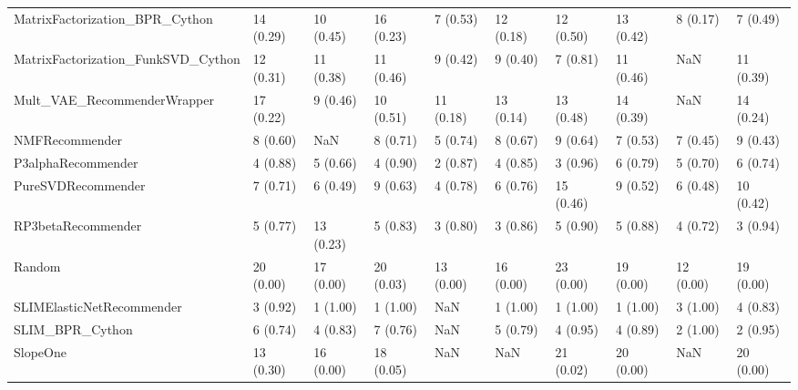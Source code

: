 \begin{tabular}{llllllllll}
     MatrixFactorization\_BPR\_Cython &                14 (0.29) &   10 (0.45) &     16 (0.23) &     7 (0.53) &            12 (0.18) &           12 (0.50) &         13 (0.42) &           8 (0.17) &          7 (0.49) \\
 MatrixFactorization\_FunkSVD\_Cython &                12 (0.31) &   11 (0.38) &     11 (0.46) &     9 (0.42) &             9 (0.40) &            7 (0.81) &         11 (0.46) &                NaN &         11 (0.39) \\
        Mult\_VAE\_RecommenderWrapper &                17 (0.22) &    9 (0.46) &     10 (0.51) &    11 (0.18) &            13 (0.14) &           13 (0.48) &         14 (0.39) &                NaN &         14 (0.24) \\
                     NMFRecommender &                 8 (0.60) &         NaN &      8 (0.71) &     5 (0.74) &             8 (0.67) &            9 (0.64) &          7 (0.53) &           7 (0.45) &          9 (0.43) \\
                 P3alphaRecommender &                 4 (0.88) &    5 (0.66) &      4 (0.90) &     2 (0.87) &             4 (0.85) &            3 (0.96) &          6 (0.79) &           5 (0.70) &          6 (0.74) \\
                 PureSVDRecommender &                 7 (0.71) &    6 (0.49) &      9 (0.63) &     4 (0.78) &             6 (0.76) &           15 (0.46) &          9 (0.52) &           6 (0.48) &         10 (0.42) \\
                 RP3betaRecommender &                 5 (0.77) &   13 (0.23) &      5 (0.83) &     3 (0.80) &             3 (0.86) &            5 (0.90) &          5 (0.88) &           4 (0.72) &          3 (0.94) \\
                             Random &                20 (0.00) &   17 (0.00) &     20 (0.03) &    13 (0.00) &            16 (0.00) &           23 (0.00) &         19 (0.00) &          12 (0.00) &         19 (0.00) \\
          SLIMElasticNetRecommender &                 3 (0.92) &    1 (1.00) &      1 (1.00) &          NaN &             1 (1.00) &            1 (1.00) &          1 (1.00) &           3 (1.00) &          4 (0.83) \\
                    SLIM\_BPR\_Cython &                 6 (0.74) &    4 (0.83) &      7 (0.76) &          NaN &             5 (0.79) &            4 (0.95) &          4 (0.89) &           2 (1.00) &          2 (0.95) \\
                           SlopeOne &                13 (0.30) &   16 (0.00) &     18 (0.05) &          NaN &                  NaN &           21 (0.02) &         20 (0.00) &                NaN &         20 (0.00) \\

\end{tabular}
